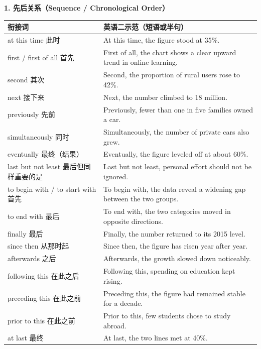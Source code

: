 \documentclass[11pt,a4paper]{ctexart}
\begin{document}
\par\addvspace{6pt}\noindent\textbf{1. 先后关系（Sequence / Chronological Order）}\par\addvspace{2pt}
\begin{longtable}{L{5.4cm}L{10.6cm}}
\toprule
\textbf{衔接词} & \textbf{英语二示范（短语或半句）} \\
\midrule
\endhead
at this time 此时 & At this time, the figure stood at 35\%. \\
first / first of all 首先 & First of all, the chart shows a clear upward trend in online learning. \\
second 其次 & Second, the proportion of rural users rose to 42\%. \\
next 接下来 & Next, the number climbed to 18 million. \\
previously 先前 & Previously, fewer than one in five families owned a car. \\
simultaneously 同时 & Simultaneously, the number of private cars also grew. \\
eventually 最终（结果） & Eventually, the figure leveled off at about 60\%. \\
last but not least 最后但同样重要的是 & Last but not least, personal effort should not be ignored. \\
to begin with / to start with 首先 & To begin with, the data reveal a widening gap between the two groups. \\
to end with 最后 & To end with, the two categories moved in opposite directions. \\
finally 最后 & Finally, the number returned to its 2015 level. \\
since then 从那时起 & Since then, the figure has risen year after year. \\
afterwards 之后 & Afterwards, the growth slowed down noticeably. \\
following this 在此之后 & Following this, spending on education kept rising. \\
preceding this 在此之前 & Preceding this, the figure had remained stable for a decade. \\
prior to this 在此之前 & Prior to this, few students chose to study abroad. \\
at last 最终 & At last, the two lines met at 40\%. \\
\bottomrule
\end{longtable}
\end{document}
